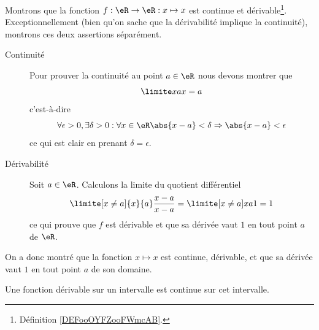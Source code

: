 \begin{example}
	Montrons que la fonction \( f : \eR \to \eR : x\mapsto x\) est continue et dérivable\footnote{Définition \ref{DEFooOYFZooFWmcAB}.}. Exceptionnellement (bien qu'on sache que la dérivabilité implique la continuité), montrons ces deux assertions séparément.
	\begin{description}
		\item[Continuité] Pour prouver la continuité au point \( a \in \eR\) nous devons montrer que
		      \begin{equation}
			      \limite x a x = a
		      \end{equation}
		      c'est-à-dire
		      \begin{equation}
			      \forall \epsilon > 0, \exists \delta > 0 :  \forall x \in \eR \abs{x-a} <
			      \delta \Rightarrow \abs{x-a} < \epsilon
		      \end{equation}
		      ce qui est clair en prenant \( \delta = \epsilon\).

		\item[Dérivabilité] Soit \( a \in \eR\). Calculons la limite du quotient différentiel
		      \begin{equation}
			      \limite[x\neq a]{x}{a} \frac{x-a}{x-a} = \limite[x\neq a]x a 1 = 1
		      \end{equation}
		      ce qui prouve que \( f\) est dérivable et que sa dérivée vaut \( 1\) en
		      tout point \( a\) de \( \eR\).
	\end{description}

	On a donc montré que la fonction \( x \mapsto x\) est continue, dérivable, et que sa dérivée vaut \( 1\) en tout point \( a\) de son domaine.

\end{example}

\begin{proposition} \label{PropSFyxOWF}
	Une fonction dérivable sur un intervalle est continue sur cet intervalle.
\end{proposition}

